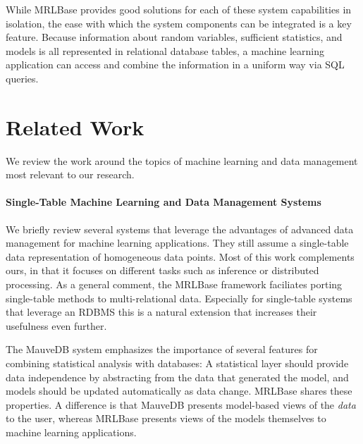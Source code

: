 \documentclass{acm_proc_article-sp}
\begin{document}
While MRLBase provides good solutions for each of these system capabilities in isolation, the ease with which the system components can be integrated is a key feature. Because information about random variables, sufficient statistics, and models 
is all represented in relational database tables,
a machine learning application can access and combine the information in a uniform way via SQL queries.




\section{Related Work} \label{sec:related}
We review the work around the topics of machine learning and data management most relevant to our research.

\paragraph{Single-Table Machine Learning and Data Management Systems}
We briefly review several systems that leverage the advantages of advanced data management for machine learning applications. 
They still 
assume a single-table data representation of homogeneous data points.  Most of this work complements ours, in that it focuses on different tasks such as inference or distributed processing. As a general comment, 
the MRLBase framework faciliates porting single-table methods to multi-relational data. Especially for single-table systems that leverage an RDBMS this is a natural extension that increases their usefulness even further.


The MauveDB system \cite{Deshpande2006a} emphasizes the importance of several features for combining statistical analysis with databases: A statistical layer should provide data independence by abstracting from the data that generated the model, and models should be updated automatically as data change. MRLBase shares these properties.
A difference is that MauveDB presents model-based views of the {\em data} to the user, whereas MRLBase presents views of the models themselves to machine learning applications. 
\end{document}
